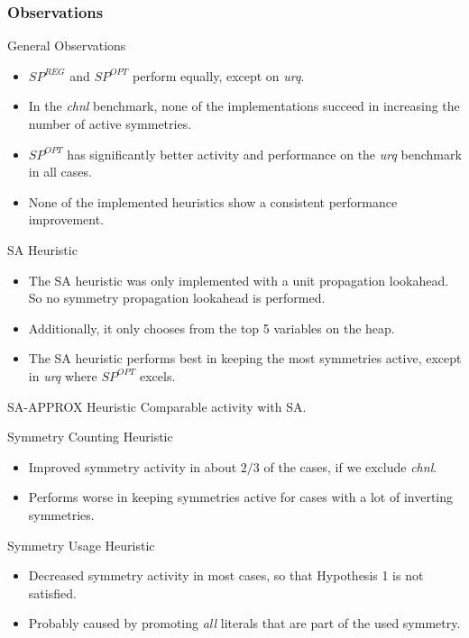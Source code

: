 \documentclass{beamer}
\begin{document}
	\begin{frame}[allowframebreaks]
		\frametitle{Observations}
		\begin{block}{General Observations}
			\begin{itemize}
				\item $SP^{REG}$ and $SP^{OPT}$ perform equally, except on \emph{urq}.
				\item In the \emph{chnl} benchmark, none of the implementations succeed in increasing the number of active symmetries.
				\item $SP^{OPT}$ has significantly better activity and performance on the \emph{urq} benchmark in all cases.
				\item None of the implemented heuristics show a consistent performance improvement.
			\end{itemize}
		\end{block}

		\begin{block}{SA Heuristic}
			\begin{itemize}
				\item The SA heuristic was only implemented with a unit propagation lookahead.
					So no symmetry propagation lookahead is performed.
				\item Additionally, it only chooses from the top 5 variables on the heap.
				\item The SA heuristic performs best in keeping the most symmetries active, except in \emph{urq} where $SP^{OPT}$ excels.
			\end{itemize}
		\end{block}

		\begin{block}{SA-APPROX Heuristic}
			Comparable activity with SA.
		\end{block}

		\begin{block}{Symmetry Counting Heuristic}
			\begin{itemize}
				\item Improved symmetry activity in about $2/3$ of the cases, if we exclude \emph{chnl}.
				\item Performs worse in keeping symmetries active for cases with a lot of inverting symmetries.
			\end{itemize}
		\end{block}

		\begin{block}{Symmetry Usage Heuristic}
			\begin{itemize}
				\item Decreased symmetry activity in most cases, so that Hypothesis 1 is not satisfied.
				\item Probably caused by promoting \emph{all} literals that are part of the used symmetry.
			\end{itemize}
		\end{block}
	\end{frame}
	
\end{document}
